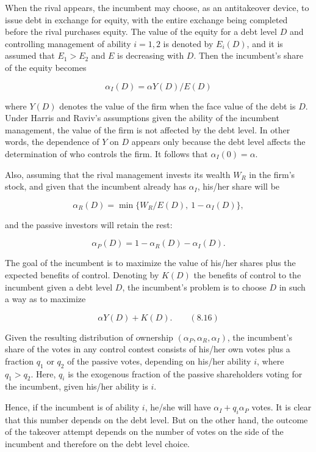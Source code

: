 \documentclass[11pt,a4paper]{article}
\begin{document}
When the rival appears, the incumbent may choose, as an antitakeover device, to issue debt in
exchange for equity, with the entire exchange being completed before the rival purchases equity. The
value of the equity for a debt level \(D\) and controlling management of ability \(i = 1, 2\) is
denoted by \(E_i(D)\), and it is assumed that \(E_1 > E_2\) and \(E\) is decreasing with \(D\). Then
the incumbent's share of the equity becomes

\[\alpha_I(D) = \alpha Y(D)/E(D)\]

where \(Y(D)\) denotes the value of the firm when the face value of the debt is \(D\). Under Harris
and Raviv's assumptions given the ability of the incumbent management, the value of the firm is not
affected by the debt level. In other words, the dependence of \(Y\) on \(D\) appears only because
the debt level affects the determination of who controls the firm. It follows that
\(\alpha_I(0) = \alpha\).

Also, assuming that the rival management invests its wealth \(W_R\) in the firm's stock, and given
that the incumbent already has \(\alpha_I\), his/her share will be

\[\alpha_R(D) = \min\{W_R/E(D),\ 1 - \alpha_I(D)\},\]

and the passive investors will retain the rest:

\[\alpha_P(D) = 1 - \alpha_R(D) - \alpha_I(D).\]

The goal of the incumbent is to maximize the value of his/her shares plus the expected benefits of
control. Denoting by \(K(D)\) the benefits of control to the incumbent given a debt level \(D\), the
incumbent's problem is to choose \(D\) in such a way as to maximize

\[\alpha Y(D) + K(D). \qquad (8.16)\]

Given the resulting distribution of ownership \((\alpha_P, \alpha_R, \alpha_I)\), the incumbent's
share of the votes in any control contest consists of his/her own votes plus a fraction \(q_1\) or
\(q_2\) of the passive votes, depending on his/her ability \(i\), where \(q_1 > q_2\). Here, \(q_i\)
is the exogenous fraction of the passive shareholders voting for the incumbent, given his/her
ability is \(i\).

Hence, if the incumbent is of ability \(i\), he/she will have \(\alpha_I + q_i\alpha_P\) votes. It
is clear that this number depends on the debt level. But on the other hand, the outcome of the
takeover attempt depends on the number of votes on the side of the incumbent and therefore on the
debt level choice.
\end{document}
